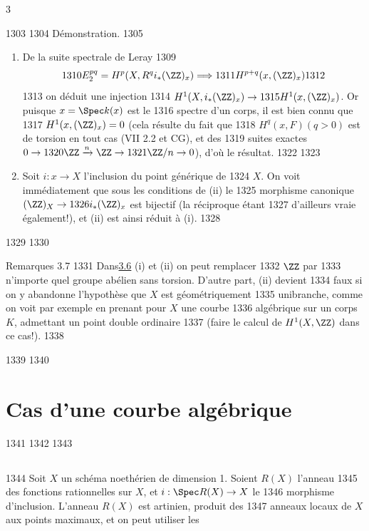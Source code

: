 3	\documentclass[10pt]{../fichiers-configuration-latex/smfart}
\begin{document}
  1303	
  1304	Démonstration.
  1305	\begin{enumerate}
  1306	\renewcommand{\theenumi}{\roman{enumi}}
  1307	\renewcommand{\labelenumi}{(\theenumi)}
  1308	\item De la suite spectrale de Leray
  1309	$$
  1310	E^{pq}_2=H^p(X,R^{q}i_{\ast}(\ZZ)_x)\Longrightarrow
  1311	H^{p+q}(x,(\ZZ)_x)
  1312	$$
  1313	on déduit une injection
  1314	$H^1(X,i_{\ast}(\ZZ)_x)\rightarrow
  1315	H^1(x,(\ZZ)_x)$. Or puisque $x=\Spec k(x)$ est le
  1316	spectre d'un corps, il est bien connu que
  1317	$H^1(x,(\ZZ)_{x})=0$ (cela résulte du fait que
  1318	$H^q(x,F)(q>0)$ est de torsion en tout cas (\cf VII 2.2 et CG), et des
  1319	suites exactes $0\rightarrow
  1320	\ZZ\xrightarrow{n}\ZZ\rightarrow
  1321	\ZZ/n\rightarrow 0$), d'où le résultat.
  1322	
  1323	\item Soit $i:x\rightarrow X$ l'inclusion du point générique de
  1324	$X$. On voit immédiatement que sous les conditions de (ii) le
  1325	morphisme canonique $(\ZZ)_X\rightarrow
  1326	i_{\ast}(\ZZ)_x$ est bijectif (la réciproque étant
  1327	d'ailleurs vraie également!), et (ii) est ainsi réduit à (i).
  1328	\end{enumerate}
  1329	
  1330	\begin{enonce*}[remark]{Remarques 3.7}
  1331	Dans\pageoriginale \hyperref[IX.prop3.6]{3.6} (i) et (ii) on peut remplacer
  1332	$\ZZ$ par
  1333	n'importe quel groupe abélien sans torsion. D'autre part, (ii) devient
  1334	faux si on y abandonne l'hypothèse que $X$ est géométriquement
  1335	unibranche, comme on voit par exemple en prenant pour $X$ une courbe
  1336	algébrique sur un corps $K$, admettant un point double ordinaire
  1337	(faire le calcul de $H^1(X,\ZZ)$ dans ce cas!).
  1338	\end{enonce*}
  1339	
  1340	\section{Cas d'une courbe algébrique}
  1341	
  1342	\setcounter{subsection}{-1}
  1343	\subsection{}
  1344	Soit $X$ un schéma noethérien de dimension 1. Soient $R(X)$ l'anneau
  1345	des fonctions rationnelles sur $X$, et $i:\Spec R(X)\rightarrow X$ le
  1346	morphisme d'inclusion. L'anneau $R(X)$ est artinien, produit des
  1347	anneaux locaux de $X$ aux points maximaux, et on peut utiliser les
\end{document}
